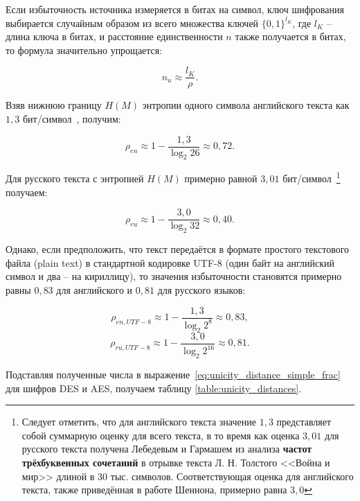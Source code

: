 Если избыточность источника измеряется в битах на символ, ключ шифрования выбирается случайным образом из всего множества ключей $\{0, 1\}^{l_K}$, где $l_K$ -- длина ключа в битах, и расстояние единственности $n$ также получается в битах, то формула значительно упрощается:

\begin{equation}\label{eq:unicity_distance_simple_frac}
n_u \approx \frac{l_K}{\rho}.
\end{equation}

Взяв нижнюю границу $H(M)$ энтропии одного символа английского текста как $1{,}3$ бит/символ~\cite{Shannon:1951, Schneier:2002}, получим:

	\[ \rho _{en} \approx 1 - \frac{ 1{,}3 }{ \log _2 {26} } \approx 0{,}72.\]

Для русского текста с энтропией $H(M)$ примерно равной $3{,}01$ бит/символ~\cite{Lebedev:1958}\footnote{Следует отметить, что для английского текста значение $1{,}3$ представляет собой суммарную оценку для всего текста, в то время как оценка $3{,}01$ для русского текста получена Лебедевым и Гармашем из анализа \textbf{частот трёхбуквенных сочетаний} в отрывке текста Л. Н. Толстого <<Война и мир>> длиной в 30 тыс. символов. Соответствующая оценка для английского текста, также приведённая в работе Шеннона, примерно равна $3{,}0$} получаем:

	\[ \rho _{ru} \approx 1 - \frac{ 3{,}0 }{ \log _2 {32} } \approx 0{,}40.\]

Однако, если предположить, что текст передаётся в формате простого текстового файла (plain text) в стандартной кодировке UTF-8 (один байт на английский символ и два -- на кириллицу), то значения избыточности становятся примерно равны $0{,}83$ для английского и $0{,}81$ для русского языков:

	\[ \rho _{en, UTF-8} \approx 1 - \frac{ 1{,}3 }{ \log _2 {2^{8}} } \approx 0{,}83,\]
	\[ \rho _{ru, UTF-8} \approx 1 - \frac{ 3{,}0 }{ \log _2 {2^{16}} } \approx 0{,}81.\]

Подставляя полученные числа в выражение~\ref{eq:unicity_distance_simple_frac} для шифров DES и AES, получаем таблицу \ref{table:unicity_distances}.

